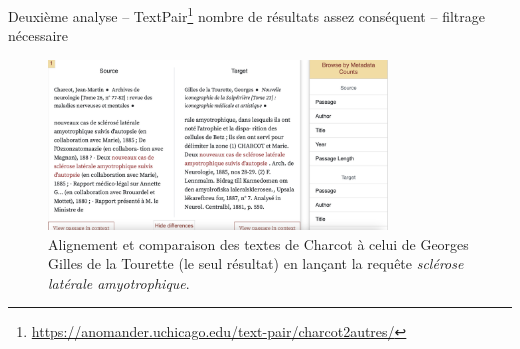 \begin{frame}{Deuxième analyse -- TextPair\footnote{\url{https://anomander.uchicago.edu/text-pair/charcot2autres/}}}
\danger nombre de
résultats assez conséquent -- filtrage nécessaire
    \begin{figure}[!ht]
        \centering
        \includegraphics[width=90mm,scale=0.5]{pic/textpair.png}
        \caption{Alignement et comparaison des textes de
Charcot à celui de Georges Gilles de la Tourette (le seul
résultat) en lançant la requête \textit{sclérose latérale
amyotrophique}.}
        \label{fig:enter-label}
    \end{figure}
\end{frame}
